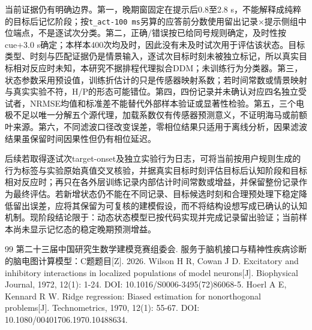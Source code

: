 \documentclass[12pt,a4paper]{article}
\begin{document}
当前证据仍有明确边界。第一，晚期窗固定在提示后0.8至2.8 s，不能解释成纯粹的目标后记忆阶段；按\texttt{t\_act-100\ ms}另算的应答前分数使用留出记录×提示侧组中位端点，不是逐试次分类。第二，正确/错误按已给同号规则确定，及时性按cue+3.0 s确定；本样本400次均及时，因此没有未及时试次用于评估该状态。目标类型、时刻与匹配证据仍是情景输入，逐试次目标时刻未被独立标记，所以真实目标相对反应时未知，本研究不据排程代理拟合DDM；未训练行为分类器。第三，状态参数采用预设值，训练折估计的只是传感器映射系数；若时间常数或情景映射与真实实验不符，H/P的形态可能错位。第四，四份记录并未确认对应四名独立受试者，NRMSE均值和标准差不能替代外部样本验证或显著性检验。第五，三个电极不足以唯一分解五个源代理，加载系数仅有传感器预测意义，不证明海马或前额叶来源。第六，不同滤波口径改变误差，零相位结果只适用于离线分析，因果滤波结果虽保留时间因果性但仍有相位延迟。

后续若取得逐试次target-onset及独立实验行为日志，可将当前按用户规则生成的行为标签与实验原始真值交叉核验，并据真实目标时刻评估目标后认知阶段和目标相对反应时；再只在各外层训练记录内部估计时间常数或增益，并保留整份记录作为最终评估。若新增状态仍不能在不同记录、目标候选时刻和合理预处理下稳定降低留出误差，应将其保留为可复核的建模假设，而不将结构设想写成已确认的认知机制。现阶段结论限于：动态状态模型已按代码实现并完成记录留出验证；当前样本尚未显示记忆态的稳定晚期预测增益。

\clearpage
{}

\begin{thebibliography}{99}
\setlength{\itemsep}{2pt}
 第二十三届中国研究生数学建模竞赛组委会. 服务于脑机接口与精神性疾病诊断的脑电图计算模型：C题题目[Z]. 2026.
 Wilson H R, Cowan J D. Excitatory and inhibitory interactions in localized populations of model neurons[J]. Biophysical Journal, 1972, 12(1): 1-24. DOI: 10.1016/S0006-3495(72)86068-5.
 Hoerl A E, Kennard R W. Ridge regression: Biased estimation for nonorthogonal problems[J]. Technometrics, 1970, 12(1): 55-67. DOI: 10.1080/00401706.1970.10488634.
\end{thebibliography}
\end{document}
